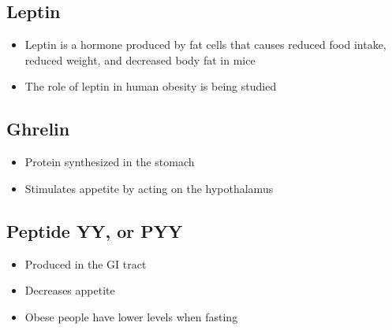 \documentclass[title={Chapter 10: Achieving and Maintaining a Healthful Body Weight}]{fdsn201notes}
\begin{document}
\subsection{Leptin}\label{subsec:leptin}
\begin{itemize}
	\item Leptin is a hormone produced by fat cells that causes reduced food intake, reduced weight, and decreased body fat in mice
	\item The role of leptin in human obesity is being studied
\end{itemize}

\subsection{Ghrelin}\label{subsec:ghrelin}
\begin{itemize}
	\item Protein synthesized in the stomach
	\item Stimulates appetite by acting on the hypothalamus
\end{itemize}

\subsection{Peptide YY, or PYY}\label{subsec:peptide-yy-or-pyy}
\begin{itemize}
	\item Produced in the GI tract
	\item Decreases appetite
	\item Obese people have lower levels when fasting
\end{itemize}
\end{document}
